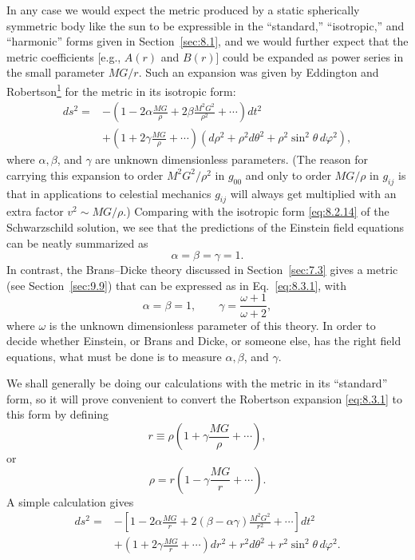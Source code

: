 In any case we would expect the metric produced by a static spherically
symmetric body like the sun to be expressible in the ``standard,''
``isotropic,'' and ``harmonic'' forms given in Section~\ref{sec:8.1}, and
we would further expect that the metric coefficients [e.g., \(A(r)\) and
\(B(r)\)] could be expanded as power series in the small parameter \(MG/r\).
Such an expansion was given by Eddington and
Robertson\hyperref[ch8-ref-1]{\textsuperscript{1}} for the metric in its
isotropic form:
\begin{equation}
  \begin{split}
  ds^2={}&
  -\left(
    1-2\alpha\frac{MG}{\rho}
    +2\beta\frac{M^2G^2}{\rho^2}+\cdots
  \right)dt^2\\
  &+
  \left(1+2\gamma\frac{MG}{\rho}+\cdots\right)
  \left(d\rho^2+\rho^2d\theta^2
  +\rho^2\sin^2\theta\,d\varphi^2\right),
  \end{split}
  \tag{8.3.1}\label{eq:8.3.1}
\end{equation}
where \(\alpha,\beta\), and \(\gamma\) are unknown dimensionless
parameters. (The reason for carrying this expansion to order
\(M^2G^2/\rho^2\) in \(g_{00}\) and only to order \(MG/\rho\) in
\(g_{ij}\) is that in applications to celestial mechanics \(g_{ij}\) will
always get multiplied with an extra factor \(v^2\sim MG/\rho\).)
Comparing with the isotropic form \eqref{eq:8.2.14} of the Schwarzschild
solution, we see that the predictions of the Einstein field equations can
be neatly summarized as
\begin{equation}
  \alpha=\beta=\gamma=1.
  \tag{8.3.2}\label{eq:8.3.2}
\end{equation}
In contrast, the Brans--Dicke theory discussed in Section~\ref{sec:7.3}
gives a metric (see Section~\ref{sec:9.9}) that can be expressed as in
Eq.~\eqref{eq:8.3.1}, with
\begin{equation}
  \alpha=\beta=1,\qquad
  \gamma=\frac{\omega+1}{\omega+2},
  \tag{8.3.3}\label{eq:8.3.3}
\end{equation}
where \(\omega\) is the unknown dimensionless parameter of this theory. In
order to decide whether Einstein, or Brans and Dicke, or someone else, has
the right field equations, what must be done is to measure
\(\alpha,\beta\), and \(\gamma\).

We shall generally be doing our calculations with the metric in its
``standard'' form, so it will prove convenient to convert the Robertson
expansion \eqref{eq:8.3.1} to this form by defining
\begin{equation}
  r\equiv\rho\left(1+\gamma\frac{MG}{\rho}+\cdots\right),
  \tag{8.3.4}\label{eq:8.3.4}
\end{equation}
or
\[
  \rho=r\left(1-\gamma\frac{MG}{r}+\cdots\right).
\]
A simple calculation gives
\begin{equation}
  \begin{split}
  ds^2={}&
  -\left[
    1-2\alpha\frac{MG}{r}
    +2(\beta-\alpha\gamma)\frac{M^2G^2}{r^2}
    +\cdots
  \right]dt^2\\
  &+
  \left(1+2\gamma\frac{MG}{r}+\cdots\right)dr^2
  +r^2d\theta^2+r^2\sin^2\theta\,d\varphi^2.
  \end{split}
  \tag{8.3.5}\label{eq:8.3.5}
\end{equation}

